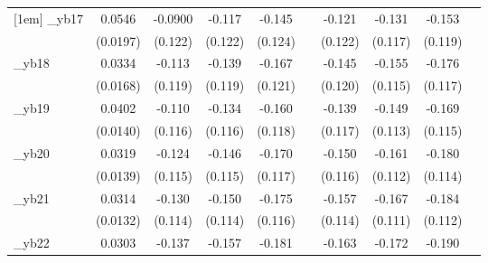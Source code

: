 \begin{table}[htbp]
\begin{tabular}{l*{9}{c}}
[1em]
\_yb17       &      0.0546\sym{***}&     -0.0900         &      -0.117         &      -0.145         &                     &      -0.121         &      -0.131         &      -0.153         &                     \\
            &    (0.0197)         &     (0.122)         &     (0.122)         &     (0.124)         &                     &     (0.122)         &     (0.117)         &     (0.119)         &                     \\
[1em]
\_yb18       &      0.0334\sym{**} &      -0.113         &      -0.139         &      -0.167         &                     &      -0.145         &      -0.155         &      -0.176         &                     \\
            &    (0.0168)         &     (0.119)         &     (0.119)         &     (0.121)         &                     &     (0.120)         &     (0.115)         &     (0.117)         &                     \\
[1em]
\_yb19       &      0.0402\sym{***}&      -0.110         &      -0.134         &      -0.160         &                     &      -0.139         &      -0.149         &      -0.169         &                     \\
            &    (0.0140)         &     (0.116)         &     (0.116)         &     (0.118)         &                     &     (0.117)         &     (0.113)         &     (0.115)         &                     \\
[1em]
\_yb20       &      0.0319\sym{**} &      -0.124         &      -0.146         &      -0.170         &                     &      -0.150         &      -0.161         &      -0.180         &                     \\
            &    (0.0139)         &     (0.115)         &     (0.115)         &     (0.117)         &                     &     (0.116)         &     (0.112)         &     (0.114)         &                     \\
[1em]
\_yb21       &      0.0314\sym{**} &      -0.130         &      -0.150         &      -0.175         &                     &      -0.157         &      -0.167         &      -0.184         &                     \\
            &    (0.0132)         &     (0.114)         &     (0.114)         &     (0.116)         &                     &     (0.114)         &     (0.111)         &     (0.112)         &                     \\
[1em]
\_yb22       &      0.0303\sym{**} &      -0.137         &      -0.157         &      -0.181         &                     &      -0.163         &      -0.172         &      -0.190\sym{*}  &                     \\

\end{tabular}
\end{table}
